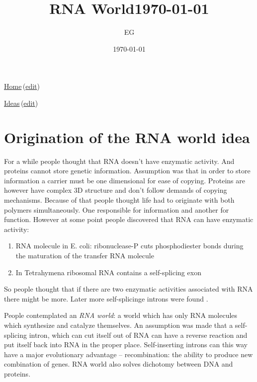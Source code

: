 \documentclass[12pt]{paper}
\title{RNA World\today}
\author{EG}
\date{\today}
\newcommand{\wikilink}[2] { \href{#1.pdf}{#2}\,(\href{#1.tex}{edit})}
\begin{document}
 \maketitle
\wikilink{home}{Home}

\wikilink{ideas}{Ideas}

\section{Origination of the RNA world idea}

For a while people thought that RNA doesn't have enzymatic activity. And proteins cannot store 
genetic information. Assumption was that in order to store information a carrier must be one 
dimensional for ease of copying. Proteins are however have complex 3D structure and don't follow 
demands of copying mechanisms. 
 Because of that people thought life had to originate with both polymers 
simultaneously. One responsible for information and another for function. However at some point 
people discovered that RNA can have enzymatic activity:\
\begin{enumerate}
 \item RNA molecule in E. coli: ribonuclease-P cuts phosphodiester bonds during the maturation of 
the transfer RNA molecule\cite{Guerrier-Takada1983,Guerrier-Takada1984}
\item In Tetrahymena ribosomal RNA contains a self-splicing exon \cite{Cech1981,Kruger1982}
\end{enumerate}
So people thought that if there are two enzymatic activities associated with RNA there might be 
more. Later more self-splicinge introns were found \cite{Cech1986}.

People contemplated an \textit{RNA world}: a world which has only RNA molecules which synthesize 
and catalyze themselves. An assumption was made that a self-splicing intron, which can cut itself 
out of RNA can have a reverse reaction and put itself back into RNA in the proper place. 
Self-inserting introns can this way have a major evolutionary advantage -- recombination: the 
ability to produce new combination of genes. RNA world also solves dichotomy between DNA and 
proteins. 
\end{document}
